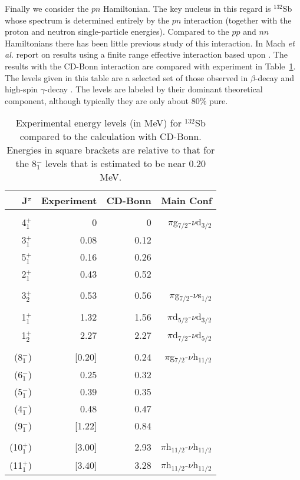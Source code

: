 \documentclass[aps,twocolumn,superscriptaddress,prc,showpacs]{revtex4}
\begin{document}
Finally we consider the $  pn  $ Hamiltonian.
The key nucleus
in this regard is $^{132}$Sb whose spectrum is determined entirely
by the $  pn  $ interaction (together with the proton and neutron
single-particle energies).
Compared to the
$  pp  $ and $  nn  $ Hamiltonians there has been
little previous study of this interaction.
In \cite{Mach95} Mach {\em et al.} report on results using a finite 
range effective interaction based upon \cite{Ero94}.
The results with the CD-Bonn interaction are compared with
experiment in Table~\ref{tab3}. The levels given in this table
are a selected set of those observed in $\beta$-decay \cite{Stone89}
and high-spin $\gamma$-decay \cite{Daley}. The levels are    
labeled by their dominant theoretical component, although
typically they are only about $80\%$ pure.   
\begingroup
\begin{table}
 \caption{\label{tab3}
Experimental energy levels (in MeV) for $^{132}$Sb compared to
the calculation with CD-Bonn.
Energies in square brackets are relative to that for the 8$^{-}_{1}$
levels that is estimated to be near 0.20 MeV.
}
\begin{ruledtabular}
\begin{tabular}{rrrr}
J$^{ \pi }$ & Experiment & CD-Bonn & Main Conf\\
\hline \\
 4$^{ + }_{1}$ &     0 &     0 & $\pi$g$_{7/2}$-$\nu$d$_{3/2}$
\\
 3$^{ + }_{1}$ &   0.08 &   0.12 & \\
 5$^{ + }_{1}$ &   0.16 &   0.26 & \\
 2$^{ + }_{1}$ &   0.43 &   0.52 & \\
\hline \\
 3$^{ + }_{2}$ &   0.53 &   0.56 & $\pi$g$_{7/2}$-$\nu$s$_{1/2}$
\\
\hline \\
 1$^{ + }_{1}$ &  1.32 &  1.56 & $\pi$d$_{5/2}$-$\nu$d$_{3/2}$
\\
 1$^{ + }_{2}$ &  2.27 &  2.27 & $\pi$d$_{7/2}$-$\nu$d$_{5/2}$
\\
\hline \\
 (8$^{-}_{1}$) & [0.20] &   0.24 &
$\pi$g$_{7/2}$-$\nu$h$_{11/2}$ \\
 (6$^{-}_{1}$) & 0.25 &   0.32 &   \\
 (5$^{-}_{1}$) & 0.39 &   0.35 &   \\
 (4$^{-}_{1}$) & 0.48 &   0.47 &  \\
 (9$^{-}_{1}$) & [1.22] &  0.84 &  \\
\hline \\
 (10$^{ + }_{1}$) & [3.00] &  2.93 &
$\pi$h$_{11/2}$-$\nu$h$_{11/2}$ \\
 (11$^{ + }_{1}$) & [3.40] &  3.28 &
$\pi$h$_{11/2}$-$\nu$h$_{11/2}$ \\
\end{tabular}
\end{ruledtabular}
\end{table}
\endgroup
\end{document}
